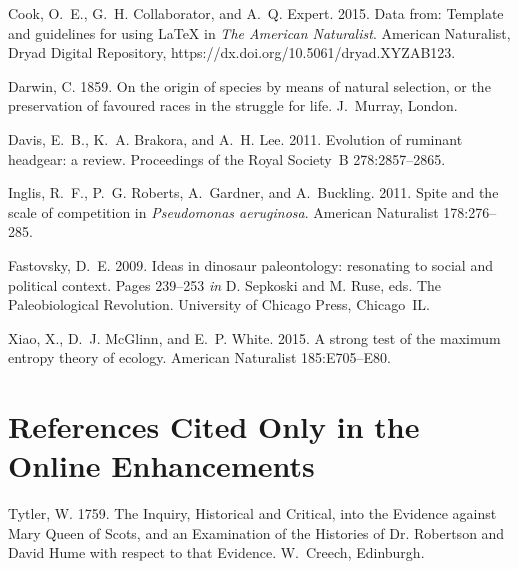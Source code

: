 \documentclass[11pt]{article}
\begin{document}
\begin{thebibliography}{}

Cook, O.~E., G.~H. Collaborator, and A.~Q. Expert. 2015.
\newblock Data from: Template and guidelines for using \LaTeX{} in \textit{The American Naturalist}.
\newblock American Naturalist, Dryad Digital Repository, https://dx.doi.org/10.5061/dryad.XYZAB123.

Darwin, C. 1859.
\newblock On the origin of species by means of natural selection, or the preservation of favoured races in the struggle for life.
\newblock J.~Murray, London.

Davis, E.~B., K.~A. Brakora, and A.~H. Lee. 2011.
\newblock Evolution of ruminant headgear: a review.
\newblock Proceedings of the Royal Society~B 278:2857--2865.

Inglis, R.~F., P.~G. Roberts, A.~Gardner, and A.~Buckling. 2011.
\newblock Spite and the scale of competition in \textit{Pseudomonas
  aeruginosa}.
\newblock American Naturalist 178:276--285.

Fastovsky, D.~E. 2009.
\newblock Ideas in dinosaur paleontology: resonating to social and political context.
\newblock Pages 239--253 \emph{in} D. Sepkoski and M. Ruse, eds. The Paleobiological Revolution. University of Chicago Press, Chicago~IL.

Xiao, X., D.~J. McGlinn, and E.~P. White. 2015.
\newblock A strong test of the maximum entropy theory of ecology.
\newblock American Naturalist 185:E705--E80.

\section*{References Cited Only in the Online Enhancements}


Tytler, W. 1759.
\newblock The Inquiry, Historical and Critical, into the Evidence against Mary Queen of Scots, and an Examination of the Histories of Dr. Robertson and David Hume with respect to that Evidence.
\newblock W.~Creech, Edinburgh.

\end{thebibliography}
\end{document}
